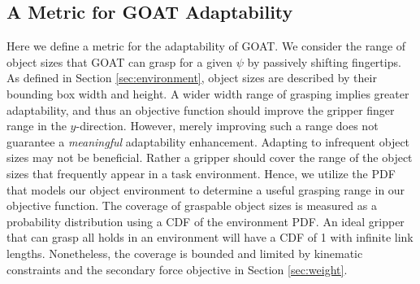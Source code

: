 \documentclass[letterpaper, 10 pt, conference]{ieeeconf}  %
\begin{document}
\subsection{A Metric for GOAT Adaptability}
Here we define a metric for the adaptability of GOAT. We consider the range of object sizes that GOAT can grasp for a given $\psi$ by passively shifting fingertips. %
As defined in Section \ref{sec:environment}, object sizes are described by their bounding box width and height. A wider width range of grasping implies greater adaptability, and thus an objective function should improve the gripper finger range in the $y$-direction. However, merely improving such a range does not guarantee a \textit{meaningful} adaptability enhancement. 
Adapting to infrequent object sizes may not be beneficial. Rather a gripper should cover the range of the object sizes that frequently appear in a task environment. Hence, we utilize the PDF that models our object environment to determine a useful grasping range in our objective function. The coverage of graspable object sizes is measured as a probability distribution using a CDF of the environment PDF. An ideal gripper that can grasp all holds in an environment will have a CDF of 1 with infinite link lengths. Nonetheless, the coverage is bounded and limited by kinematic constraints and the secondary force objective in Section \ref{sec:weight}. 
\end{document}
